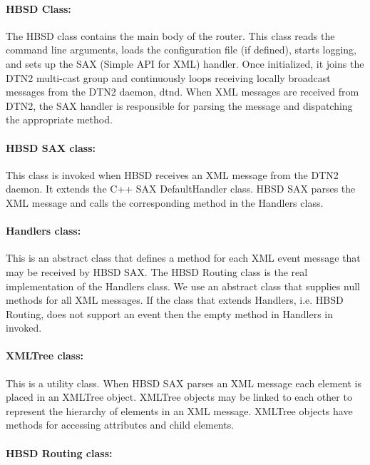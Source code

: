 \paragraph{HBSD Class:}

The HBSD class contains the main body of the router. This class reads the
command line arguments, loads the configuration file (if defined), starts
logging, and sets up the SAX (Simple API for XML) handler. Once initialized,
it joins the DTN2 multi-cast group and continuously loops receiving locally
broadcast messages from the DTN2 daemon, dtnd. When XML messages are received
from DTN2, the SAX handler is responsible for parsing the message and
dispatching the appropriate method.

\paragraph{HBSD SAX class:}

This class is invoked when HBSD receives an XML message from the DTN2 daemon.
It extends the C++ SAX DefaultHandler class. HBSD SAX parses the XML message
and calls the corresponding method in the Handlers class.

\paragraph{Handlers class:}

This is an abstract class that defines a method for each XML event message
that may be received by HBSD SAX. The HBSD Routing class is the real
implementation of the Handlers class. We use an abstract class that supplies
null methods for all XML messages. If the class that extends Handlers, i.e.
HBSD Routing, does not support an event then the empty method in Handlers in
invoked.

\paragraph{XMLTree class:}

This is a utility class. When HBSD SAX parses an XML message each element is
placed in an XMLTree object. XMLTree objects may be linked to each other to
represent the hierarchy of elements in an XML message. XMLTree objects have
methods for accessing attributes and child elements.

\paragraph{HBSD Routing class:}


